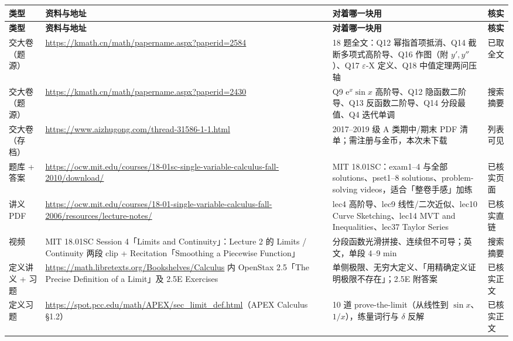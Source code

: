 \documentclass[11pt,a4paper]{ctexart}
\newcommand{\eps}{\varepsilon}
\newcommand{\ee}{\mathrm{e}}
\begin{document}
{\footnotesize
\begin{longtable}{@{}p{2.7cm}p{4.9cm}p{6.0cm}p{1.5cm}@{}}
\toprule
\textbf{类型} & \textbf{资料与地址} & \textbf{对着哪一块用} & \textbf{核实} \\
\midrule
\endfirsthead
\toprule
\textbf{类型} & \textbf{资料与地址} & \textbf{对着哪一块用} & \textbf{核实} \\
\midrule
\endhead
\bottomrule
\endfoot

交大卷（题源） & \url{https://kmath.cn/math/papername.aspx?paperid=2584} & 18 题全文：Q12 幂指首项抵消、Q14 截断多项式高阶导、Q16 作图（附 $y',y''$）、Q17 $\eps$-X 定义、Q18 中值定理两问压轴 & 已取全文 \\[2pt]

交大卷（题源） & \url{https://kmath.cn/math/papername.aspx?paperid=2430} & Q9 $\ee^x\sin x$ 高阶导、Q12 隐函数二阶导、Q13 反函数二阶导、Q14 分段最值、Q4 迭代单调 & 搜索摘要 \\[2pt]

交大卷（存档） & \url{https://www.aizhugong.com/thread-31586-1-1.html} & 2017--2019 级 A 类期中/期末 PDF 清单；需注册与金币，本次未下载 & 列表可见 \\[2pt]

题库 + 答案 & \url{https://ocw.mit.edu/courses/18-01sc-single-variable-calculus-fall-2010/download/} & MIT 18.01SC：exam1--4 与全部 solutions、pset1--8 solutions、problem-solving videos，适合「整卷手感」加练 & 已核实页面 \\[2pt]

讲义 PDF & \url{https://ocw.mit.edu/courses/18-01-single-variable-calculus-fall-2006/resources/lecture-notes/} & lec4 高阶导、lec9 线性/二次近似、lec10 Curve Sketching、lec14 MVT and Inequalities、lec37 Taylor Series & 已核实直链 \\[2pt]

视频 & MIT 18.01SC Session 4「Limits and Continuity」：Lecture 2 的 Limits / Continuity 两段 clip + Recitation「Smoothing a Piecewise Function」 & 分段函数光滑拼接、连续但不可导；英文，单段 4--9 min & 搜索摘要 \\[2pt]

定义讲义 + 习题 & \url{https://math.libretexts.org/Bookshelves/Calculus} 内 OpenStax 2.5「The Precise Definition of a Limit」及 2.5E Exercises & 单侧极限、无穷大定义、「用精确定义证明极限不存在」；2.5E 附答案 & 已核实正文 \\[2pt]

定义习题 & \url{https://spot.pcc.edu/math/APEX/sec_limit_def.html}（APEX Calculus §1.2） & 10 道 prove-the-limit（从线性到 $\sin x$、$1/x$），练量词行与 $\delta$ 反解 & 已核实正文 \\[2pt]


\end{longtable}}
\end{document}
